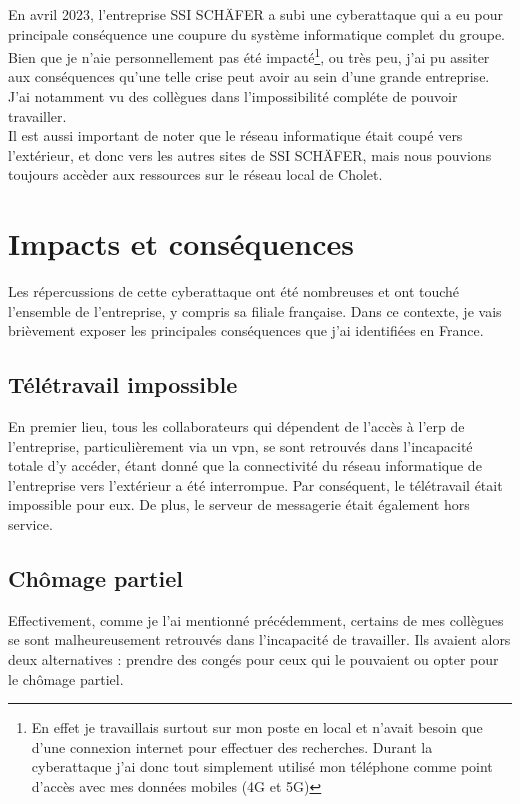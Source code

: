 \documentclass[a4paper, 12pt, french]{article}
\begin{document}
				En avril 2023, l'entreprise SSI SCHÄFER a subi une cyberattaque qui a eu pour principale conséquence une coupure du système informatique complet du groupe.\\

				Bien que je n'aie personnellement pas été impacté\footnote{En effet je travaillais surtout sur mon poste en local et n'avait besoin que d'une connexion internet pour effectuer des recherches. Durant la cyberattaque j'ai donc tout simplement utilisé mon téléphone comme point d'accès avec mes données mobiles (4G et 5G)}, ou très peu, j'ai pu assiter aux conséquences qu'une telle crise peut avoir au sein d'une grande entreprise. J'ai notamment vu des collègues dans l'impossibilité compléte de pouvoir travailler.\\

				Il est aussi important de noter que le réseau informatique était coupé vers l'extérieur, et donc vers les autres sites de SSI SCHÄFER, mais nous pouvions toujours accèder aux ressources sur le réseau local de Cholet.

			\section{Impacts et conséquences}
				Les répercussions de cette cyberattaque ont été nombreuses et ont touché l'ensemble de l'entreprise, y compris sa filiale française. Dans ce contexte, je vais brièvement exposer les principales conséquences que j'ai identifiées en France.
				
				\subsection{Télétravail impossible}
					En premier lieu, tous les collaborateurs qui dépendent de l'accès à l'\acrshort{erp} de l'entreprise, particulièrement via un \acrshort{vpn}, se sont retrouvés dans l'incapacité totale d'y accéder, étant donné que la connectivité du réseau informatique de l'entreprise vers l'extérieur a été interrompue. Par conséquent, le télétravail était impossible pour eux. De plus, le serveur de messagerie était également hors service.

				\subsection{Chômage partiel}
					Effectivement, comme je l'ai mentionné précédemment, certains de mes collègues se sont malheureusement retrouvés dans l'incapacité de travailler. Ils avaient alors deux alternatives : prendre des congés pour ceux qui le pouvaient ou opter pour le chômage partiel.
					
\end{document}
